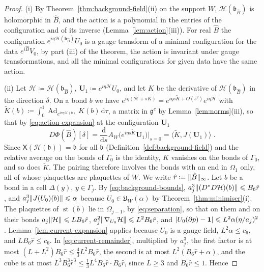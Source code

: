 \documentclass[11pt]{preprint}
\newcommand{\dd}{\mathrm{d}}
\newcommand{\id}{\mathbf 1}
\newcommand{\Ad}{\operatorname{Ad}}
\DeclarePairedDelimiter{\abs}{\lvert}{\rvert}
\DeclarePairedDelimiter{\norm}{\lVert}{\rVert}
\numberwithin{equation}{section}
\begin{document}
\begin{proof}
(i) By Theorem~\ref{thm:background-field}(ii) on the support $W$, $\mathcal H(\mathfrak b_{\hat B})$ is holomorphic in $\hat B$, and the action is a polynomial in the entries of the configuration and of its inverse (Lemma~\ref{lem:action}(iii)). For real $\hat B$ the configuration $e^{i\eta\mathcal H(\mathfrak b_{\hat B})}U_0$ is a gauge transform of a minimal configuration for the data $e^{i\hat B}V_0$, by part (iii) of the theorem, the action is invariant under gauge transformations, and all the minimal configurations for given data have the same action.

(ii) Let $\mathcal H \coloneqq \mathcal H(\mathfrak b_{\hat B})$, $\mathbf U_1 \coloneqq e^{i\eta\mathcal H}U_0$, and let $K$ be the derivative of $\mathcal H(\mathfrak b_{\hat B})$ in the direction $\delta$. On a bond $b$ we have $e^{i\eta(\mathcal H + sK)} = e^{i\eta s\tilde K + O(s^2)}e^{i\eta\mathcal H}$ with $\tilde K(b) \coloneqq \int_0^1\Ad_{e^{i\tau\eta\mathcal H(b)}}K(b)\,\dd\tau$, a matrix in $\mathfrak g^c$ by Lemma~\ref{lem:norms}(iii), so that by \eqref{eq:action-expansion} at the configuration $\mathbf U_1$
\[
    D\Phi(\hat B)[\delta] = \frac{\dd}{\dd s}A_W\bigl(e^{i\eta s\tilde K}\mathbf U_1\bigr)\Big|_{s=0} = \langle\tilde K, J(\mathbf U_1)\rangle\;.
\]
Since $\mathsf X(\mathcal H(\mathfrak b)) = \mathfrak b$ for all $\mathfrak b$ (Definition~\ref{def:background-field}) and the relative average on the bonds of $\Gamma_0$ is the identity, $K$ vanishes on the bonds of $\Gamma_0$, and so does $\tilde K$. The pairing therefore involves the bonds with an end in $\Omega_1$ only, all of whose plaquettes are plaquettes of $W$. We write $\hat r \coloneqq \norm{\hat B}_\infty$. Let $b$ be a bond in a cell $\Delta(y)$, $y \in \Gamma_j$. By \eqref{eq:background-bounds}, $a_j^3\norm{(D^*D\mathcal H)(b)} \leqslant B_6\hat r$, and $a_j^3\norm{J(U_0)(b)} \leqslant \alpha$ because $U_0 \in \mathfrak U_W(\alpha)$ by Theorem~\ref{thm:minimiser}(i). The plaquettes of $\operatorname{st}(b)$ lie in $\Omega_{j-1}$, by \eqref{eq:separation}, so that on them and on their bonds $a_j\norm{\mathcal H} \leqslant LB_6\hat r$, $a_j^2\norm{\nabla_{U_0}\mathcal H} \leqslant L^2B_6\hat r$, and $\abs{U_0(\partial p) - \id} \leqslant L^2\alpha(\eta/a_j)^2$. Lemma~\ref{lem:current-expansion} applies because $U_0$ is a gauge field, $L^2\alpha \leqslant c_6$, and $LB_6\hat r \leqslant c_6$. In \eqref{eq:current-remainder}, multiplied by $a_j^3$, the first factor is at most $(L + L^2)B_6\hat r \leqslant \frac{4}{3}L^2B_6\hat r$, the second is at most $L^2(B_6\hat r + \alpha)$, and the cube is at most $L^3B_6^3\hat r^3 \leqslant \frac{1}{3}L^4B_6\hat r \cdot B_6\hat r$, since $L \geqslant 3$ and $B_6\hat r \leqslant 1$. Hence

\end{proof}
\end{document}
